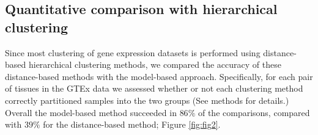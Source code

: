 




\subsection{Quantitative comparison with hierarchical clustering}

Since most clustering of gene expression datasets is performed using distance-based hierarchical clustering methods, we compared the accuracy of these distance-based methods with the model-based approach. Specifically, for each pair of tissues in the GTEx data we assessed whether or not each clustering method
correctly partitioned samples into the two groups (See methods for details.) Overall the model-based method succeeded in $86 \%$ of the comparisons, compared with $39 \%$ for the distance-based method; Figure \ref{fig:fig2}.

